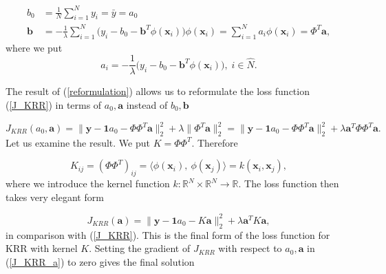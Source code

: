 \documentclass[11pt,oneside,czech,american]{book} %
\theoremstyle{definition} %
\theoremstyle{definition}
\begin{document}
\begin{equation}
	\begin{aligned}
			{b}_0 &= \frac{1}{N} \sum_{i=1}^{N} y_i = \bar{y} = a_0\\
		\bm{b} &= -\frac{1}{\lambda} \sum_{i=1}^{N}\Big( y_i - b_0 -\bm{b}^T \phi(\bm{x}_i) \Big)\phi(\bm{x}_i) = \sum_{i=1}^{N} a_i \phi(\bm{x}_i) = \Phi^T \bm{a},
	\end{aligned}
	\label{reformulation}
\end{equation}
where we put 
\begin{equation}
	a_i = -\frac{1}{\lambda} \Big( y_i - b_0 -\bm{b}^T \phi(\bm{x}_i) \Big), \; i \in \hat{N}.
\end{equation}

The result of (\ref{reformulation}) allows us to reformulate the loss function (\ref{J_KRR}) in terms of $a_0, \bm{a}$ instead of $b_0, \bm{b}$

\begin{equation}
	J_{KRR}(a_0, \bm{a}) = \| \bm{y} - \bm{1}a_0 - \Phi \Phi^T \bm{a} \|^2_2 + \lambda \| \Phi^T \bm{a} \|^2_2 = \| \bm{y} - \bm{1}a_0 - \Phi \Phi^T \bm{a} \|^2_2 + \lambda \bm{a}^T \Phi \Phi^T \bm{a}.
\end{equation}
Let us examine the result. We put  $K = \Phi \Phi^T$. Therefore

\begin{equation}
	K_{ij} = (\Phi \Phi^T)_{ij} =  \langle \phi(\bm{x}_i), \  \phi(\bm{x}_j) \rangle = k(\bm{x}_i, \bm{x}_j),
\end{equation}
where we introduce the kernel function $k: \mathbb{R}^N \times \mathbb{R}^N \rightarrow \mathbb{R}$. The loss function then takes very elegant form

\begin{equation}
	J_{KRR}(\bm{a}) = \|\bm{y} - \bm{1}a_0 - K \bm{a} \|^2_2 + \lambda \bm{a}^T K \bm{a}, \label{J_KRR_a}
\end{equation}
in comparison with (\ref{J_KRR}).
This is the final form of the loss function for KRR with kernel $K$. Setting the gradient of $J_{KRR}$ with respect to $a_0, \bm{a}$ in (\ref{J_KRR_a}) to zero gives the final solution
\end{document}
